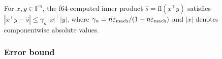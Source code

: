 \begin{unverified}
\begin{fact}\label{fact:prefilter-dot}
For $x, y \in \mathbb{F}^n$, the f64-computed inner product
$\hat{s} = \mathrm{fl}(x^\top y)$ satisfies
$|x^\top y - \hat{s}| \le \gamma_n\, |x|^\top|y|$,
where $\gamma_n = n\varepsilon_{\mathrm{mach}}/(1 - n\varepsilon_{\mathrm{mach}})$
and $|x|$ denotes componentwise absolute values.
\end{fact}
\end{unverified}

\subsubsection*{Error bound}

%
%
%
%
%

